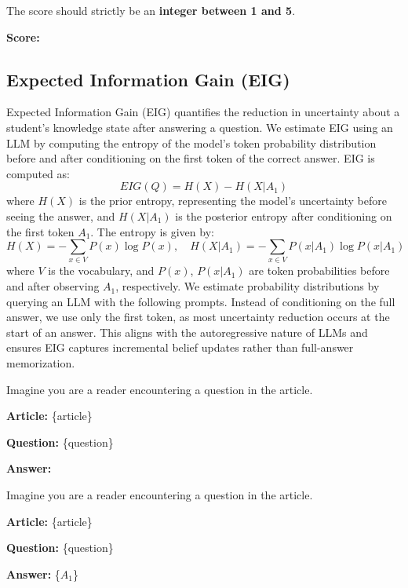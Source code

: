 \begin{tcolorbox}[title=Saliency Prediction, myboxstyle, breakable]
The score should strictly be an \textbf{integer between 1 and 5}.

\textbf{Score:}

\end{tcolorbox}


\subsection{Expected Information Gain (EIG)}
\label{appendix:eig}
Expected Information Gain (EIG) quantifies the reduction in uncertainty about a student's knowledge state after answering a question.
We estimate EIG using an LLM by computing the entropy of the model’s token probability distribution before and after conditioning on the first token of the correct answer. EIG is computed as:
\[
EIG(Q) = H(X) - H(X | A_1)
\]
where \( H(X) \) is the prior entropy, representing the model’s uncertainty before seeing the answer, and \( H(X | A_1) \) is the posterior entropy after conditioning on the first token \( A_1 \). The entropy is given by:
\[
H(X) = - \sum_{x \in V} P(x) \log P(x), \quad
H(X | A_1) = - \sum_{x \in V} P(x | A_1) \log P(x | A_1)
\]
where \( V \) is the vocabulary, and \( P(x) \), \( P(x | A_1) \) are token probabilities before and after observing \( A_1 \), respectively.
We estimate probability distributions by querying an LLM with the following prompts.
Instead of conditioning on the full answer, we use only the first token, as most uncertainty reduction occurs at the start of an answer.
This aligns with the autoregressive nature of LLMs and ensures EIG captures incremental belief updates rather than full-answer memorization.

\begin{tcolorbox}[title=Prior Entropy Estimation, myboxstyle, breakable]
Imagine you are a reader encountering a question in the article.

\textbf{Article:} \{article\}

\textbf{Question:} \{question\}

\textbf{Answer:} 
\end{tcolorbox}

\begin{tcolorbox}[title=Posterior Entropy Estimation, myboxstyle, breakable]
Imagine you are a reader encountering a question in the article.

\textbf{Article:} \{article\}

\textbf{Question:} \{question\}

\textbf{Answer:} \{$A_1$\}
\end{tcolorbox}


